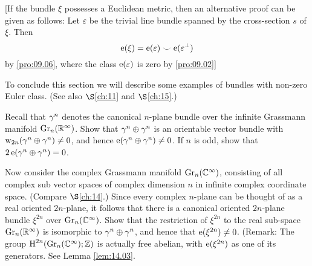\documentclass[../main]{subfiles}
\begin{document}
[If the bundle $\xi$ possesses a Euclidean metric, then an alternative proof can be given as follows: Let $\varepsilon$ be the trivial line bundle spanned by the cross-section $s$ of $\xi$. Then
\[
\operatorname{e}(\xi)=\operatorname{e}(\varepsilon) \smile \operatorname{e}(\varepsilon^{\perp})
\]
by \ref{pro:09.06}, where the class $\operatorname{e}(\varepsilon)$ is zero by \ref{pro:09.02}]

To conclude this section we will describe some examples of bundles with non-zero Euler class. (See also $\S$\ref{ch:11} and $\S$\ref{ch:15}.)

\begin{problem}\label{pro:9-A} Recall that $\gamma^{n}$ denotes the canonical $n$-plane bundle over the infinite Grassmann manifold $\operatorname{Gr}_{n}(\mathbb R^{\infty})$. Show that $\gamma^{n} \oplus \gamma^{n}$ is an orientable vector bundle with $\operatorname{w}_{2 n}(\gamma^{n} \oplus \gamma^{n}) \neq 0$, and hence $\operatorname{e}(\gamma^{n} \oplus \gamma^{n}) \neq 0$. If $n$ is odd, show that $2 \operatorname{e}(\gamma^{n} \oplus \gamma^{n})=0$.

\end{problem}

\begin{problem}\label{pro:9-B} Now consider the complex Grassmann manifold $\operatorname{Gr}_{n}(\mathbb C^{\infty})$, consisting of all complex sub vector spaces of complex dimension $n$ in infinite complex coordinate space. (Compare $\S$\ref{ch:14}.) Since every complex $n$-plane can be thought of as a real oriented $2 n$-plane, it follows that there is a canonical oriented $2 n$-plane bundle $\xi^{2n}$ over $\operatorname{Gr}_{n}(\mathbb C^{\infty})$. Show that the restriction of $\xi^{2 n}$ to the real sub-space $\operatorname{Gr}_{n}(\mathbb R^{\infty})$ is isomorphic to $\gamma^{n} \oplus \gamma^{n}$, and hence that $\operatorname{e}(\xi^{2 n}) \neq 0$. (Remark: The group $\operatorname{H}^{2 n}(\operatorname{Gr}_{n}(\mathbb C^{\infty}) ; \mathbb{Z})$ is actually free abelian, with $\operatorname{e}(\xi^{2 n})$ as one of its generators. See Lemma \ref{lem:14.03}.

\end{problem}
\end{document}
